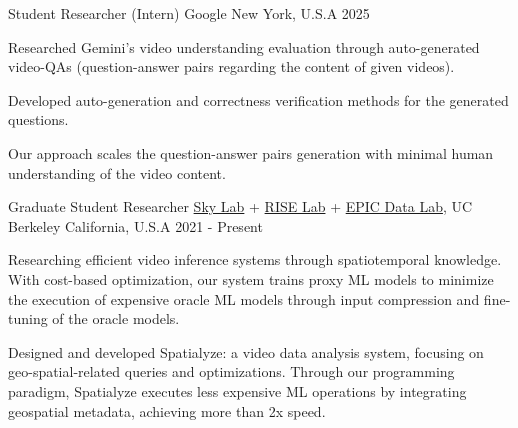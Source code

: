 

\begin{cventries}

  \cvwork
    {Student Researcher (Intern)} %
    {Google} %
    {New York, U.S.A} %
    {2025} %
    {
      \begin{cvitems} %
        \item{Researched Gemini's video understanding evaluation through auto-generated video-QAs (question-answer pairs regarding the content of given videos).}
        \item{Developed auto-generation and correctness verification methods for the generated questions.}
        \item{Our approach scales the question-answer pairs generation with minimal human understanding of the video content.}
      \end{cvitems}
    }

  \cvwork
    {Graduate Student Researcher} %
    {
        \href{https://sky.cs.berkeley.edu/}{Sky Lab} +
        \href{https://rise.cs.berkeley.edu/}{RISE Lab} +
        \href{https://epic.berkeley.edu/}{EPIC Data Lab}, UC Berkeley
    } %
    {California, U.S.A} %
    {2021 - Present} %
    {
      \begin{cvitems} %
        \item{Researching efficient video inference systems through spatiotemporal knowledge.
        With cost-based optimization, our system trains proxy ML models to minimize the execution of expensive oracle ML models through input compression and fine-tuning of the oracle models.}
        \item{Designed and developed Spatialyze: a video data analysis system, focusing on geo-spatial-related queries and optimizations. Through our programming paradigm, Spatialyze executes less expensive ML operations by integrating geospatial metadata, achieving more than 2x speed.}
      \end{cvitems}
    }


\end{cventries}
